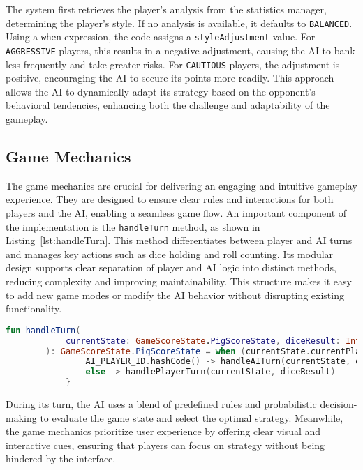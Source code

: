 The system first retrieves the player's analysis from the statistics manager, determining the player's style. If no analysis is available, it defaults to \texttt{BALANCED}. Using a \texttt{when} expression, the code assigns a \texttt{styleAdjustment} value. For \texttt{AGGRESSIVE} players, this results in a negative adjustment, causing the AI to bank less frequently and take greater risks. For \texttt{CAUTIOUS} players, the adjustment is positive, encouraging the AI to secure its points more readily. This approach allows the AI to dynamically adapt its strategy based on the opponent's behavioral tendencies, enhancing both the challenge and adaptability of the gameplay.


\subsection{Game Mechanics}

The game mechanics are crucial for delivering an engaging and intuitive gameplay experience. They are designed to ensure clear rules and interactions for both players and the AI, enabling a seamless game flow.
An important component of the implementation is the \texttt{handleTurn} method, as shown in Listing~\ref{lst:handleTurn}. This method differentiates between player and AI turns and manages key actions such as dice holding and roll counting. Its modular design supports clear separation of player and AI logic into distinct methods, reducing complexity and improving maintainability. This structure makes it easy to add new game modes or modify the AI behavior without disrupting existing functionality.

\begin{lstlisting}[language=Kotlin, caption={handleTurn Function}, label=lst:handleTurn]
    fun handleTurn(
            currentState: GameScoreState.PigScoreState, diceResult: Int? = null
        ): GameScoreState.PigScoreState = when (currentState.currentPlayerIndex) {
                AI_PLAYER_ID.hashCode() -> handleAITurn(currentState, diceResult)
                else -> handlePlayerTurn(currentState, diceResult)
            }
\end{lstlisting}

During its turn, the AI uses a blend of predefined rules and probabilistic decision-making to evaluate the game state and select the optimal strategy. Meanwhile, the game mechanics prioritize user experience by offering clear visual and interactive cues, ensuring that players can focus on strategy without being hindered by the interface.

